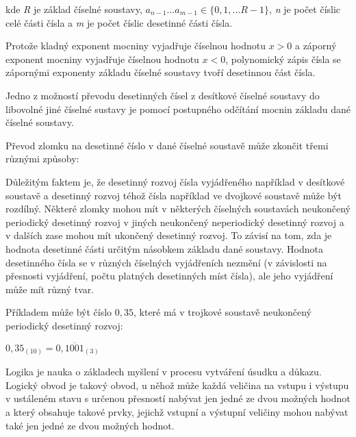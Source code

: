 kde {\it R} je základ číselné soustavy, $a_{n-1}... a_{m-1} \in \{0, 1, ... R-1\}$, {\it n} je počet číslic celé části čísla a {\it m} je počet číslic desetinné části čísla. 

Protože kladný exponent mocniny vyjadřuje číselnou hodnotu $x > 0$ a záporný exponent mocniny vyjadřuje číselnou hodnotu $x < 0$, polynomický zápis čísla se zápornými exponenty základu číselné soustavy tvoří desetinnou část čísla. 


Jedno z možností převodu desetinných čísel z desítkové číselné soustavy do libovolné jiné číselné sustavy je pomocí postupného odčítání mocnin základu dané číselné soustavy.


Převod zlomku na desetinné číslo v dané číselné soustavě může zkončit třemi různými způsoby:

\vskip 4mm
\vskip 4mm

Důležitým faktem je, že  desetinný rozvoj čísla vyjádřeného například v desítkové soustavě a desetinný rozvoj téhož čísla například ve dvojkové soustavě může být rozdílný. Některé zlomky mohou mít v některých číselných soustavách neukončený periodický desetinný rozvoj v jiných neukončený neperiodický desetinný rozvoj a v dalších zase mohou mít ukončený desetinný rozvoj. To závisí na tom, zda je hodnota desetinné části určitým násobkem základu dané soustavy. Hodnota desetinného čísla se v různých číselných vyjádřeních nezmění (v závislosti na přesnosti vyjádření, počtu platných desetinných míst čísla), ale jeho vyjádření může mít různý tvar. 

Příkladem může být číslo $0,35$, které má v trojkové soustavě neukončený periodický desetinný rozvoj:

$0,35_{(10)} = 0,\overline{1001}_{(3)}$



Logika je nauka o základech myšlení v procesu vytváření úsudku a důkazu. Logický obvod je takový obvod, u něhož může každá veličina na vstupu i výstupu v ustáleném stavu s určenou přesností nabývat jen jedné ze dvou možných hodnot a který obsahuje takové prvky, jejichž vstupní a výstupní veličiny mohou nabývat také jen jedné ze dvou možných hodnot. 

